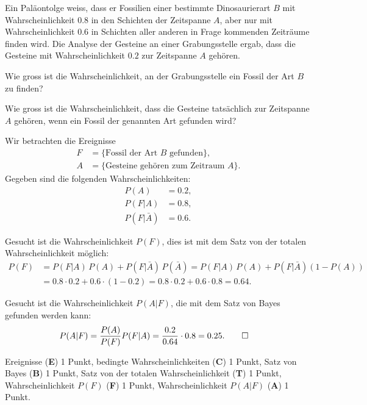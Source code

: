 Ein Paläontolge weiss, dass er Fossilien einer bestimmte Dinosaurierart $B$
mit Wahrscheinlichkeit $0.8$ in den Schichten der Zeitspanne $A$, 
aber nur mit Wahrscheinlichkeit $0.6$ in Schichten aller anderen in
Frage kommenden Zeiträume finden wird.
Die Analyse der Gesteine an einer Grabungsstelle ergab, dass die Gesteine
mit Wahrscheinlichkeit $0.2$ zur Zeitspanne $A$ gehören.
\begin{teilaufgaben}
\item
Wie gross ist die Wahrscheinlichkeit, an der Grabungsstelle ein Fossil
der Art $B$ zu finden?
\item
Wie gross ist die Wahrscheinlichkeit, dass die Gesteine tatsächlich zur
Zeitspanne $A$ gehören, wenn ein Fossil der genannten Art gefunden wird?
\end{teilaufgaben}


\begin{loesung}
Wir betrachten die Ereignisse
\begin{align*}
F&=\{\text{Fossil der Art $B$ gefunden}\},
\\
A&=\{\text{Gesteine gehören zum Zeitraum $A$}\}.
\end{align*}
Gegeben sind die folgenden Wahrscheinlichkeiten:
\begin{align*}
P(A)&=0.2,
\\
P(F|A)&=0.8,
\\
P(F|\bar A)&=0.6.
\end{align*}
\begin{teilaufgaben}
\item
Gesucht ist die Wahrscheinlichkeit $P(F)$, dies ist mit dem Satz von der
totalen Wahrscheinlichkeit möglich:
\begin{align*}
P(F)
&=
P(F|A)\,P(A) + P(F|\bar A)\,P(\bar A)
=
P(F|A)\,P(A) + P(F|\bar A)(1-P(A))
\\
&=
0.8\cdot 0.2 + 0.6\cdot (1-0.2)
=
0.8\cdot 0.2 + 0.6\cdot 0.8
=0.64.
\end{align*}
\item
Gesucht ist die Wahrscheinlichkeit $P(A|F)$, die mit dem Satz von Bayes 
gefunden werden kann:
\begin{align*}
P(A|F)
&=
\frac{P(A)}{P(F)}P(F|A)
=
\frac{0.2}{0.64}\cdot 0.8
=
0.25.
\qedhere
\end{align*}
\end{teilaufgaben}
\end{loesung}

\begin{bewertung}
Ereignisse ({\bf E}) 1 Punkt,
bedingte Wahrscheinlichkeiten ({\bf C}) 1 Punkt,
Satz von Bayes ({\bf B}) 1 Punkt,
Satz von der totalen Wahrscheinlichkeit ({\bf T}) 1 Punkt,
Wahrscheinlichkeit $P(F)$ ({\bf F}) 1 Punkt,
Wahrscheinlichkeit $P(A|F)$ ({\bf A}) 1 Punkt.
\end{bewertung}


